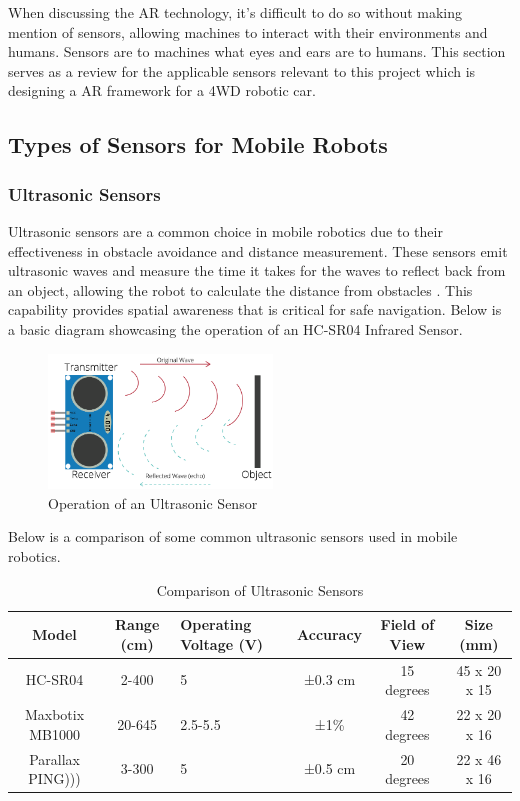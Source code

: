 When discussing the AR technology, it's difficult to do so without making mention of sensors, allowing machines to interact with their environments and humans. Sensors are to machines what eyes and ears are to humans. This section serves as a review for the applicable sensors relevant to this project which is designing a AR framework for a 4WD robotic car.

\subsection{Types of Sensors for Mobile Robots}

\subsubsection{Ultrasonic Sensors} 
Ultrasonic sensors are a common choice in mobile robotics due to their effectiveness in obstacle avoidance and distance measurement. These sensors emit ultrasonic waves and measure the time it takes for the waves to reflect back from an object, allowing the robot to calculate the distance from obstacles \cite{maupin2023ultrasonic}. This capability provides spatial awareness that is critical for safe navigation. Below is a basic diagram showcasing the operation of an HC-SR04 Infrared Sensor.

\begin{figure}[ht]
    \centering
    \includegraphics[width=0.53\textwidth]{ch2/figs/ultrasonic_sensor.png} %
    \caption{Operation of an Ultrasonic Sensor \cite{randomnerd2021ultrasonic}}
    \label{fig:ultrasonic_sensor}
\end{figure}

\noindent
Below is a comparison of some common ultrasonic sensors used in mobile robotics.

\begin{table}[ht]
\centering
\caption{Comparison of Ultrasonic Sensors}
\begin{tabularx}{\textwidth}{|c|c|X|c|c|c|}
\hline
\textbf{Model} & \textbf{Range (cm)} & \textbf{Operating Voltage (V)} & \textbf{Accuracy} & \textbf{Field of View} & \textbf{Size (mm)} \\ \hline
HC-SR04 & 2-400 & 5 & ±0.3 cm & 15 degrees & 45 x 20 x 15 \\ \hline
Maxbotix MB1000 & 20-645 & 2.5-5.5 & ±1\% & 42 degrees & 22 x 20 x 16 \\ \hline
Parallax PING))) & 3-300 & 5 & ±0.5 cm & 20 degrees & 22 x 46 x 16 \\ \hline
\end{tabularx}
\label{tab:ultrasonic_comparison}
\end{table}


